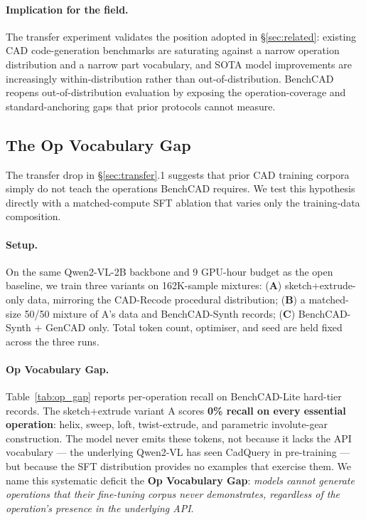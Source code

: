 \documentclass{article}
\begin{document}
\paragraph{Implication for the field.} The transfer experiment validates the position adopted in \S\ref{sec:related}: existing CAD code-generation benchmarks are saturating against a narrow operation distribution and a narrow part vocabulary, and SOTA model improvements are increasingly within-distribution rather than out-of-distribution. BenchCAD reopens out-of-distribution evaluation by exposing the operation-coverage and standard-anchoring gaps that prior protocols cannot measure.

\subsection{The Op Vocabulary Gap}
\label{sec:op_gap}

The transfer drop in \S\ref{sec:transfer}.1 suggests that prior CAD training corpora simply do not teach the operations BenchCAD requires. We test this hypothesis directly with a matched-compute SFT ablation that varies only the training-data composition.

\paragraph{Setup.} On the same Qwen2-VL-2B backbone and 9 GPU-hour budget as the open baseline, we train three variants on 162K-sample mixtures: (\textbf{A}) sketch+extrude-only data, mirroring the CAD-Recode procedural distribution; (\textbf{B}) a matched-size 50/50 mixture of A's data and BenchCAD-Synth records; (\textbf{C}) BenchCAD-Synth + GenCAD only. Total token count, optimiser, and seed are held fixed across the three runs.

\paragraph{Op Vocabulary Gap.} Table~\ref{tab:op_gap} reports per-operation recall on BenchCAD-Lite hard-tier records. The sketch+extrude variant A scores \textbf{0\% recall on every essential operation}: helix, sweep, loft, twist-extrude, and parametric involute-gear construction. The model never emits these tokens, not because it lacks the API vocabulary --- the underlying Qwen2-VL has seen CadQuery in pre-training --- but because the SFT distribution provides no examples that exercise them. We name this systematic deficit the \textbf{Op Vocabulary Gap}: \emph{models cannot generate operations that their fine-tuning corpus never demonstrates, regardless of the operation's presence in the underlying API}.
\end{document}
